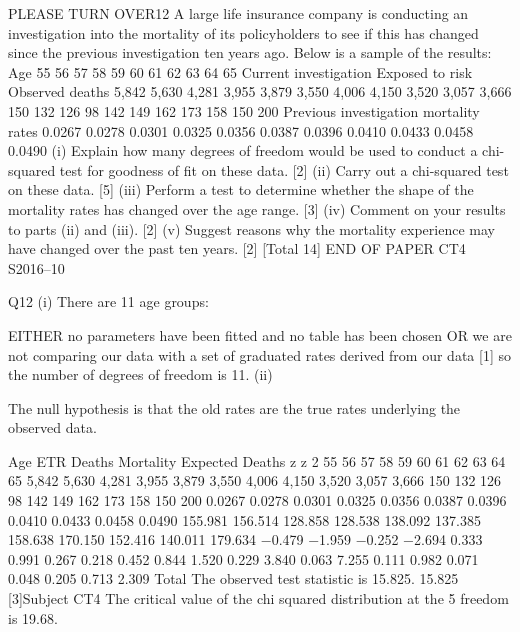 \documentclass[a4paper,12pt]{article}
\begin{document}
PLEASE TURN OVER12
A large life insurance company is conducting an investigation into the mortality of its
policyholders to see if this has changed since the previous investigation ten years ago.
Below is a sample of the results:
Age
55
56
57
58
59
60
61
62
63
64
65
Current investigation
Exposed to risk Observed deaths
5,842
5,630
4,281
3,955
3,879
3,550
4,006
4,150
3,520
3,057
3,666
150
132
126
98
142
149
162
173
158
150
200
Previous investigation
mortality rates
0.0267
0.0278
0.0301
0.0325
0.0356
0.0387
0.0396
0.0410
0.0433
0.0458
0.0490
(i) Explain how many degrees of freedom would be used to conduct a chi-squared
test for goodness of fit on these data.
[2]
(ii) Carry out a chi-squared test on these data.
[5]
(iii) Perform a test to determine whether the shape of the mortality rates has
changed over the age range.
[3]
(iv) Comment on your results to parts (ii) and (iii).
[2]
(v) Suggest reasons why the mortality experience may have changed over the past
ten years.
[2]
[Total 14]
END OF PAPER
CT4 S2016–10

Q12
(i)
There are 11 age groups:

EITHER
no parameters have been fitted and no table has been chosen
OR
we are not comparing our data with a set of graduated rates derived from our data [1]
so the number of degrees of freedom is 11.
(ii)

The null hypothesis is that the old rates are the true rates underlying the observed data.

Age ETR Deaths Mortality Expected
Deaths z z 2
55
56
57
58
59
60
61
62
63
64
65 5,842
5,630
4,281
3,955
3,879
3,550
4,006
4,150
3,520
3,057
3,666 150
132
126
98
142
149
162
173
158
150
200 0.0267
0.0278
0.0301
0.0325
0.0356
0.0387
0.0396
0.0410
0.0433
0.0458
0.0490 155.981
156.514
128.858
128.538
138.092
137.385
158.638
170.150
152.416
140.011
179.634 −0.479
−1.959
−0.252
−2.694
0.333
0.991
0.267
0.218
0.452
0.844
1.520 0.229
3.840
0.063
7.255
0.111
0.982
0.071
0.048
0.205
0.713
2.309
Total
The observed test statistic is 15.825.
15.825
[3]Subject CT4 %
The critical value of the chi squared distribution at the 5%
freedom is 19.68.
\end{document}
